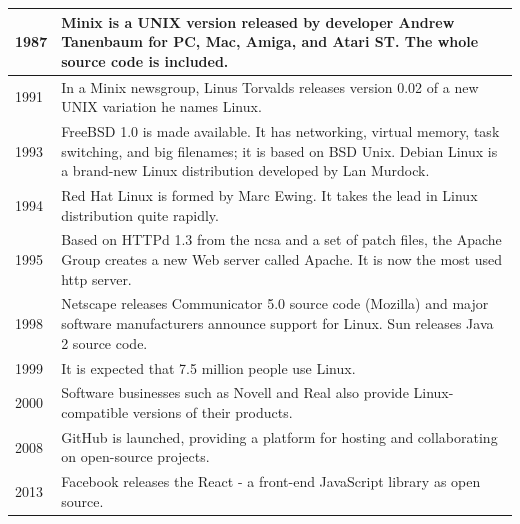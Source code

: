 \begin{center}
\begin{longtable}{|p{1cm}|p{13cm}|}
        1987          & Minix is a UNIX version released by developer Andrew Tanenbaum for PC, Mac, Amiga, and Atari ST. The whole source code is included.                                                                    \\ \hline
        1991          & In a Minix newsgroup, Linus Torvalds releases version 0.02 of a new UNIX variation he names Linux.                                                                                                     \\ \hline
        1993          & FreeBSD 1.0 is made available. It has networking, virtual memory, task switching, and big filenames; it is based on BSD Unix. Debian Linux is a brand-new Linux distribution developed by Lan Murdock. \\ \hline
        1994          & Red Hat Linux is formed by Marc Ewing. It takes the lead in Linux distribution quite rapidly.                                                                                                          \\ \hline
        1995          & Based on HTTPd 1.3 from the \ac{ncsa} and a set of patch files, the Apache Group creates a new Web server called Apache. It is now the most used \ac{http} server.                                     \\ \hline
        1998          & Netscape releases Communicator 5.0 source code (Mozilla) and major software manufacturers announce support for Linux. Sun releases Java 2 source code.                                                 \\ \hline
        1999          & It is expected that 7.5 million people use Linux.                                                                                                                                                      \\ \hline
        2000          & Software businesses such as Novell and Real also provide Linux-compatible versions of their products.                                                                                                  \\ \hline
        2008          & GitHub is launched, providing a platform for hosting and collaborating on open-source projects.                                                                                                        \\ \hline
        2013          & Facebook releases the React - a front-end JavaScript library as open source.                                                                                                                           \\ \hline

\end{longtable}
\end{center}
